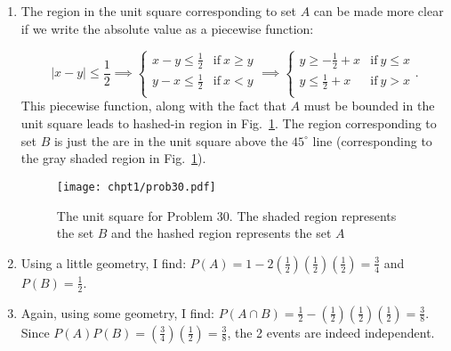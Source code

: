 	
\begin{problem}{30} $ $
\begin{enumerate}
\item  The region in the unit square corresponding to set $A$ can be made more clear if we write the absolute value as a piecewise function:

\begin{equation*}
|x-y| \le \frac{1}{2} \implies
  \begin{cases}
                                   x-y \le \frac{1}{2} & \mathrm{if}~x \ge y \\
                                    y-x \le \frac{1}{2}  & \mathrm{if}~x<y \\

  \end{cases}
  \implies
  \begin{cases}
                                   y \ge - \frac{1}{2}+x & \mathrm{if}~y \le x \\
                                    y \le \frac{1}{2}+x  & \mathrm{if}~y>x \\

  \end{cases}.
\end{equation*}
This piecewise function, along with the fact that $A$ must be bounded in the unit square leads to hashed-in region in Fig.~\ref{fig:prob_30}.  The region corresponding to set $B$ is just the are in the unit square above the $45^\circ$ line (corresponding to the gray shaded region in Fig.~\ref{fig:prob_30}).

	\begin{figure}[t]
	\centering
      		 \texttt{[image: chpt1/prob30.pdf]}
  			  \caption{The unit square for Problem 30.  The shaded region represents the set $B$ and the hashed region represents the set $A$}
    			   \label{fig:prob_30}
	\end{figure}
	
\item Using a little geometry, I find: $P(A) = 1- 2\left (\frac{1}{2} \right)\left (\frac{1}{2} \right)\left (\frac{1}{2} \right) = \frac{3}{4}$ and $P(B)=\frac{1}{2}$.

\item Again, using some geometry, I find: $P(A\cap B) = \frac{1}{2} - \left (\frac{1}{2} \right)\left (\frac{1}{2} \right)\left (\frac{1}{2} \right) = \frac{3}{8}$.  Since $P(A)P(B) =  \left (\frac{3}{4} \right) \left (\frac{1}{2} \right) =\frac{3}{8}$, the 2 events are indeed independent.

\end{enumerate}

\end{problem}


